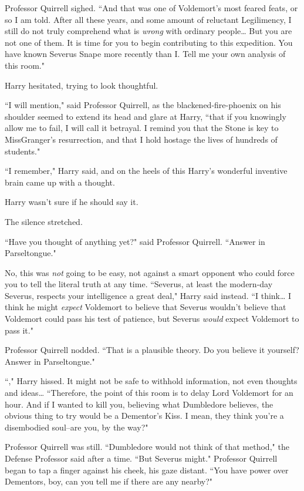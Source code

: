 Professor Quirrell sighed. ``And that was one of Voldemort's most feared feats, or so I am told. After all these years, and some amount of reluctant Legilimency, I still do not truly comprehend what is \emph{wrong} with ordinary people{\ldots} But you are not one of them. It is time for you to begin contributing to this expedition. You have known Severus Snape more recently than I\@. Tell me your own analysis of this room."

Harry hesitated, trying to look thoughtful.

``I will mention," said Professor Quirrell, as the blackened-fire-phoenix on his shoulder seemed to extend its head and glare at Harry, ``that if you knowingly allow me to fail, I will call it betrayal. I remind you that the Stone is key to Miss\?Granger's resurrection, and that I hold hostage the lives of hundreds of students."

``I remember," Harry said, and on the heels of this Harry's wonderful inventive brain came up with a thought.

Harry wasn't sure if he should say it.

The silence stretched.

``Have you thought of anything yet?" said Professor Quirrell. ``Answer in Parseltongue."

No, this was \emph{not} going to be easy, not against a smart opponent who could force you to tell the literal truth at any time. ``Severus, at least the modern-day Severus, respects your intelligence a great deal," Harry said instead. ``I think{\ldots} I think he might \emph{expect} Voldemort to believe that Severus wouldn't believe that Voldemort could pass his test of patience, but Severus \emph{would} expect Voldemort to pass it."

Professor Quirrell nodded. ``That is a plausible theory. Do you believe it yourself? Answer in Parseltongue."

``," Harry hissed. It might not be safe to withhold information, not even thoughts and ideas{\ldots} ``Therefore, the point of this room is to delay Lord Voldemort for an hour. And if I wanted to kill you, believing what Dumbledore believes, the obvious thing to try would be a Dementor's Kiss. I mean, they think you're a disembodied soul\---are you, by the way?"

Professor Quirrell was still. ``Dumbledore would not think of that method," the Defense Professor said after a time. ``But Severus might." Professor Quirrell began to tap a finger against his cheek, his gaze distant. ``You have power over Dementors, boy, can you tell me if there are any nearby?"

